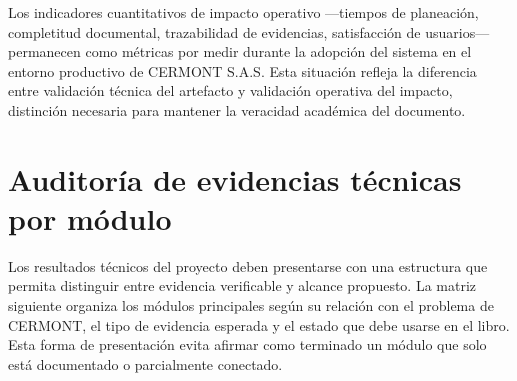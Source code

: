 Los indicadores cuantitativos de impacto operativo —tiempos de planeación, completitud documental, trazabilidad de evidencias, satisfacción de usuarios— permanecen como métricas por medir durante la adopción del sistema en el entorno productivo de CERMONT S.A.S. Esta situación refleja la diferencia entre validación técnica del artefacto y validación operativa del impacto, distinción necesaria para mantener la veracidad académica del documento.

\section{Auditoría de evidencias técnicas por módulo}
\label{sec:auditoria-evidencias-tecnicas-modulo}

Los resultados técnicos del proyecto deben presentarse con una estructura que permita distinguir entre evidencia verificable y alcance propuesto. La matriz siguiente organiza los módulos principales según su relación con el problema de CERMONT, el tipo de evidencia esperada y el estado que debe usarse en el libro. Esta forma de presentación evita afirmar como terminado un módulo que solo está documentado o parcialmente conectado.

